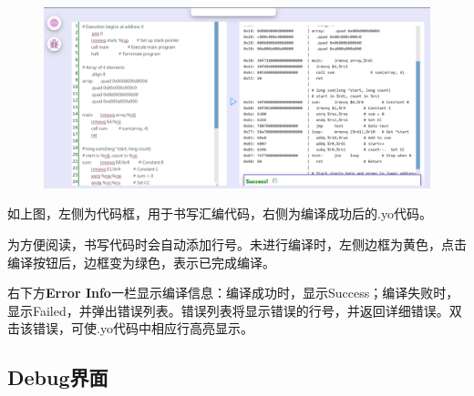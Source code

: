 \documentclass[12pt]{article} %
\begin{document}
\begin{sloppypar}
\begin{figure}[htbp]
\begin{center}
\includegraphics[width=\linewidth]{asset/2.png}
\end{center}
\end{figure}

如上图，左侧为代码框，用于书写汇编代码，右侧为编译成功后的.yo代码。

为方便阅读，书写代码时会自动添加行号。未进行编译时，左侧边框为黄色，点击编译按钮后，边框变为绿色，表示已完成编译。



右下方{\bf Error Info}一栏显示编译信息：编译成功时，显示Success；编译失败时，显示Failed，并弹出错误列表。错误列表将显示错误的行号，并返回详细错误。双击该错误，可使.yo代码中相应行高亮显示。

\clearpage
\subsection{Debug界面}


\end{sloppypar}
\end{document}
